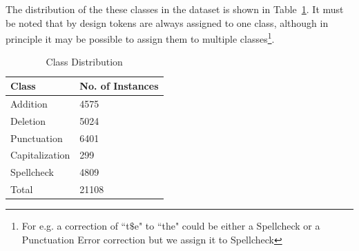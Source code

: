 \documentclass[10pt, conference, compsocconf]{IEEEtran}
\begin{document}
\begin{enumerate}
\begin{itemize}
The distribution of the these classes in the dataset is shown in Table~\ref{table: classes}. It must be noted that by design tokens are always assigned to one class, although in principle it may be possible to assign them to multiple classes\footnote{For e.g. a correction of ``t$\$$e" to ``the" could be either a Spellcheck or a Punctuation Error correction but we assign it to Spellcheck }.

\begin{table}[htdp]
\begin{center}
\begin{tabular}{| l | l |}
\hline
 Class  & No. of Instances \\
\hline
 Addition & 4575 \\
Deletion & 5024 \\
Punctuation & 6401 \\
Capitalization & 299 \\
Spellcheck & 4809 \\
\hline
Total & 21108 \\
\hline
\end{tabular}
\end{center}
\caption{Class Distribution}
\label{table: classes}
\end{table}

\end{itemize}




\end{enumerate}
\end{document}
